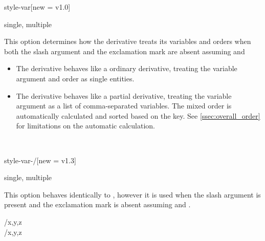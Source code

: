 \begin{option}{style-var}[new = v1.0]
	\begin{values}[default = single]
		single, multiple
	\end{values}
	This option determines how the derivative treats its variables and orders when both the slash argument and the exclamation mark are absent assuming  and 
	\begin{itemize}[widest = {}, leftmargin =*]
		\item[\val{single}] The derivative behaves like a ordinary derivative, treating the variable argument and order as single entities.
		\item[\val{multiple}] The derivative behaves like a partial derivative, treating the variable argument as a list of comma-separated variables. The mixed order is automatically calculated and sorted based on the  key. See \cref{ssec:overall_order} for limitations on the automatic calculation.
	\end{itemize}
	\begin{example}
		 \\
	\end{example}
\end{option}

\begin{option}{style-var-/}[new = v1.3]
	\begin{values}[default = single]
		single, multiple
	\end{values}
	This option behaves identically to , however it is used when the slash argument is present and the exclamation mark is absent assuming  and \keyval{switch-!}{false}.
	\begin{example}
		/{x,y,z} \\
		/{x,y,z}
	\end{example}
\end{option}

